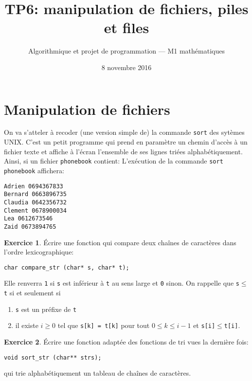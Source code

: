 \documentclass[french,a4paper]{article}
\title{\sffamily TP6: manipulation de fichiers, piles et files}%
\date{8 novembre 2016}%
\author{Algorithmique et projet de programmation --- M1
  mathématiques}%
\theoremstyle{definition}
\newtheorem{exercise}{Exercice}
\theoremstyle{remark}
\newcommand{\shell}[1]{\lstinline[style={},style=sh]|#1|}
\newcommand{\inlinec}[1]{\lstinline[style=C]°#1°}
\begin{document}
\maketitle

\section{Manipulation de fichiers}
\label{sec:sort-unix}

On va s'atteler à recoder (une version simple de) la commande
\shell{sort} des sytèmes UNIX. C'est un petit programme qui prend en
paramètre un chemin d'accès à un fichier texte et affiche à l'écran
l'ensemble de ses lignes triées alphabétiquement. Ainsi, si un fichier
\shell{phonebook} contient:
 L'exécution de la
commande \shell{sort phonebook} affichera:
\begin{lstlisting}[style={},style=sh]
Adrien 0694367833
Bernard 0663896735
Claudia 0642356732
Clement 0678900034
Lea 0612673546
Zaid 0673894765
\end{lstlisting}

\begin{exercise}
  \'Ecrire une fonction qui compare deux chaînes de caractères dans
  l'ordre lexicographique:
  \begin{lstlisting}
char compare_str (char* s, char* t);
  \end{lstlisting}
  Elle renverra \inlinec{1} si \inlinec{s} est inférieur à \inlinec{t}
  au sens large et \inlinec{0} sinon. On rappelle que
  \inlinec{s}${}\leq{}$\inlinec{t} si et seulement si
  \begin{enumerate}[label=-]
  \item \inlinec{s} est un préfixe de \inlinec{t}
  \item il existe $i\geq 0$ tel que \inlinec{s[k] = t[k]} pour tout
    $0\leq k\leq i-1$ et \inlinec{s[i]}${}\leq{}$\inlinec{t[i]}.
\end{enumerate}

\end{exercise}

\begin{exercise}
  \'Ecrire une fonction adaptée des fonctions de tri vues la dernière fois:
  \begin{lstlisting}
void sort_str (char** strs);
  \end{lstlisting}
  qui trie alphabétiquement un tableau de chaînes de caractères.
\end{exercise}
\end{document}
